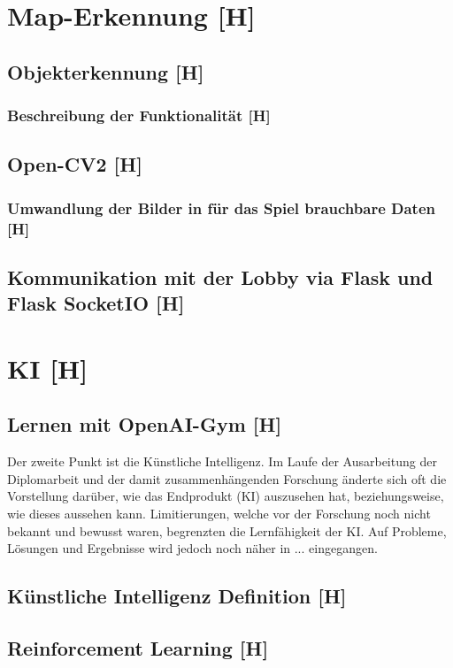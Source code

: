 

\section{Map-Erkennung [H]}
\subsection{Objekterkennung [H]}
\subsubsection{Beschreibung der Funktionalität [H]}
\subsection{Open-CV2 [H]}
\subsubsection{Umwandlung der Bilder in für das Spiel brauchbare Daten [H]}
\subsection{Kommunikation mit der Lobby via Flask und Flask SocketIO [H]}

\section{KI [H]}
\subsection{Lernen mit OpenAI-Gym [H]}
Der zweite Punkt ist die Künstliche Intelligenz. 
Im Laufe der Ausarbeitung der Diplomarbeit und der damit zusammenhängenden Forschung änderte sich oft die
Vorstellung darüber, wie das Endprodukt (KI) auszusehen hat, beziehungsweise, wie dieses aussehen kann. 
Limitierungen, welche vor der Forschung noch nicht bekannt und bewusst waren, begrenzten die Lernfähigkeit der KI.
Auf Probleme, Lösungen und Ergebnisse wird jedoch noch näher in ... eingegangen.
\subsection{Künstliche Intelligenz Definition [H]}
\subsection{Reinforcement Learning [H]}
